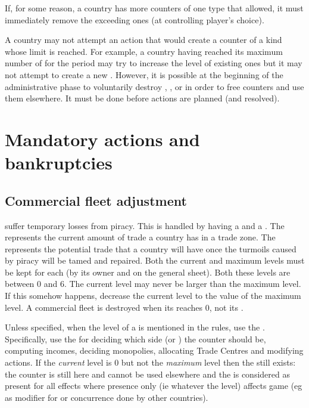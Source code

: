 \aparag If, for some reason, a country has more counters of one type that
allowed, it must immediately remove the exceeding ones (at controlling
player's choice).

\aparag A country may not attempt an action that would create a counter of a
kind whose limit is reached. For example, a country having reached its maximum
number of \COL for the period may try to increase the level of existing ones
but it may not attempt to create a new \COL.
\bparag However, it is possible at the beginning of the administrative phase
to voluntarily destroy \COL, \TP, \MNU or \TradeFLEET in order to free
counters and use them elsewhere. It must be done before actions are planned
(and resolved).




\section{Mandatory actions and bankruptcies}\label{chExpenses:Mandatory}



\subsection{Commercial fleet adjustment}\label{chExpenses:Commercial Fleet
  Adjustment}

 \TradeFLEET suffer temporary losses from
piracy. This is handled by having a  and a .
\bparag The  represents the current amount of trade a
country has in a trade zone.
\bparag The  represents the potential trade that a
country will have once the turmoils caused by piracy will be tamed and
repaired.
\bparag Both the current and maximum levels must be kept for each \TradeFLEET
(by its owner and on the general \TradeFLEET sheet).
\bparag Both these levels are between 0 and 6.
\bparag The current level may never be larger than the maximum level. If this
somehow happens, decrease the current level to the value of the maximum level.
\bparag A commercial fleet is destroyed when its  reaches
0, not its .

 Unless specified, when the level of a \TradeFLEET is
mentioned in the rules, use the .
\bparag Specifically, use the  for deciding which side
(\Facemoins or \Faceplus) the counter should be, computing incomes, deciding
monopolies, allocating Trade Centres and modifying \TFI actions.
\bparag If the \emph{current} level is 0 but not the \emph{maximum} level then
the \TradeFLEET still exists: the counter is still here and cannot be used
elsewhere and the \TradeFLEET is considered as present for all effects where
presence only (ie whatever the level) affects game (eg as modifier for \TFI or
concurrence done by other countries).

